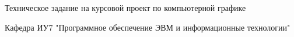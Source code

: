 \documentclass[12pt]{article}
\begin{document}
Техническое задание на курсовой проект по компьютерной графике

Кафедра ИУ7 "Программное обеспечение ЭВМ и информационные технологии"
\end{document}
